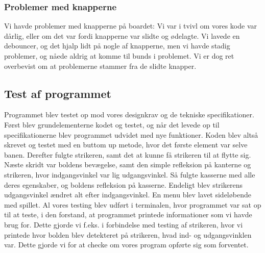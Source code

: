 \subsubsection{Problemer med knapperne}
Vi havde problemer med knapperne på boardet: Vi var i tvivl om vores kode var dårlig, eller om det var fordi knapperne var slidte og ødelagte. Vi lavede en debouncer, og det hjalp lidt på nogle af knapperne, men vi havde stadig problemer, og nåede aldrig at komme til bunds i problemet. Vi er dog ret overbevist om at problemerne stammer fra de slidte knapper.
\subsection{Test af programmet}
Programmet blev testet op mod vores designkrav og de tekniske specifikationer. Først blev grundelementerne kodet og testet, og når det levede op til specifikationerne blev programmet udvidet med nye funktioner. Koden blev altså skrevet og testet med en buttom up metode, hvor det første element var selve banen. Derefter fulgte strikeren, samt det at kunne få strikeren til at flytte sig. Næste skridt var boldens bevægelse, samt den simple refleksion på kanterne og strikeren, hvor indgangsvinkel var lig udgangsvinkel. Så fulgte kasserne med alle deres egenskaber, og boldens refleksion på kasserne. Endeligt blev strikerens udgangsvinkel ændret alt efter indgangsvinkel. En menu blev lavet sideløbende med spillet. 
Al vores testing blev udført i terminalen, hvor programmet var sat op til at teste, i den forstand, at programmet printede informationer som vi havde  brug for. Dette gjorde vi f.eks. i forbindelse med testing af strikeren, hvor vi printede hvor bolden blev detekteret på strikeren, hvad ind- og udgangsvinklen var. Dette gjorde vi for at checke om vores program opførte sig som forventet.


